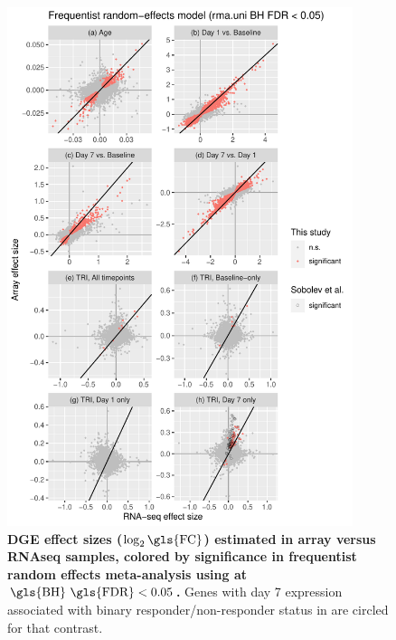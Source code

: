 \begin{figure}
    \includegraphics[width=0.9\textwidth,page=1]{mainmatter/figures/chapter_02/plot_dge_eqtl.DGE.effectSizeComparison.pdf}
    \caption{
        \textbf{\gls{DGE} effect sizes ($\log_2\text{\gls{FC}}$) estimated in array versus \gls{RNAseq} samples, colored by significance in frequentist random effects meta-analysis using  at $\text{\gls{BH} \gls{FDR}} < 0.05$.}
    Genes with day 7 expression associated with binary responder/non-responder status in \textcite{sobolev2016AdjuvantedInfluenzaH1N1Vaccination} are circled for that contrast.
    }
    \label{fig:hird_DGE_effectSizeComparisons_rma}
\end{figure}

